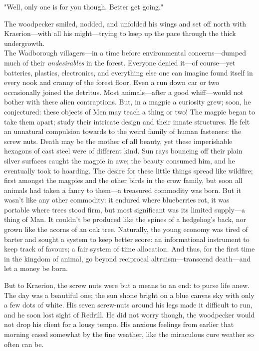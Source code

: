 "Well, only one is for you though. Better get going."

The woodpecker smiled, nodded, and unfolded his wings and set off north with Kraerion---with all his might---trying to keep up the pace through the thick undergrowth.\\

The Wadborough villagers---in a time before environmental concerns---dumped much of their \textit{undesirables} in the forest. Everyone denied it---of course---yet batteries, plastics, electronics, and everything else one can imagine found itself in every nook and cranny of the forest floor. Even a run down car or two occasionally joined the detritus. Most animals---after a good whiff---would not bother with these alien contraptions. But, in a magpie a curiosity grew; soon, he conjectured: these objects of Men may teach a thing or two! The magpie began to take them apart; study their intricate design and their innate structures. He felt an unnatural compulsion towards to the weird family of human fasteners: the screw nuts. Death may be the mother of all beauty, yet these imperishable hexagons of cast steel were of different kind. Sun rays bouncing off their plain silver surfaces caught the magpie in awe; the beauty consumed him, and he eventually took to hoarding. The desire for these little things spread like wildfire; first amongst the magpies and the other birds in the crow family, but soon all animals had taken a fancy to them---a treasured commodity was born. But it wasn't like any other commodity: it endured where blueberries rot, it was portable where trees stood firm, but most significant was its limited supply---a thing of Man. It couldn't be produced like the spines of a hedgehog's back, nor grown like the acorns of an oak tree. Naturally, the young economy was tired of barter and sought a system to keep better score: an informational instrument to keep track of favours; a fair system of time allocation. And thus, for the first time in the kingdom of animal, go beyond reciprocal altruism---transcend death---and let a money be born.  

But to Kraerion, the screw nuts were but a means to an end: to purse life anew. \\

The day was a beautiful one; the sun shone bright on a blue canvas sky with only a few dots of white. His seven screw-nuts around his legs made it difficult to run, and he soon lost sight of Redrill. He did not worry though, the woodpecker would not drop his client for a lousy tempo. His anxious feelings from earlier that morning eased somewhat by the fine weather, like the miraculous cure weather so often can be. 

